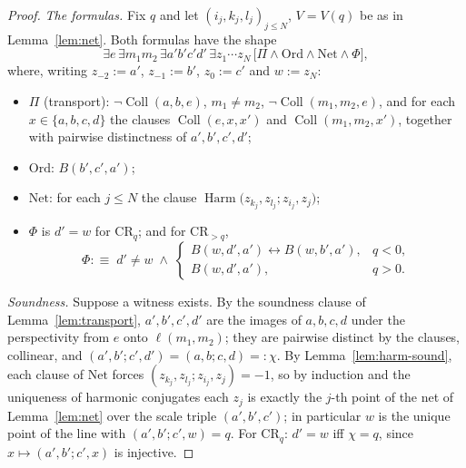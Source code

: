 \documentclass[11pt]{amsart}
\theoremstyle{definition}
\newcommand{\Coll}{\operatorname{Coll}}
\newcommand{\Harm}{\operatorname{Harm}}
\begin{document}
\begin{proof}
\emph{The formulas.} Fix $q$ and let $(i_j,k_j,l_j)_{j\le N}$, $V=V(q)$ be as
in Lemma~\ref{lem:net}. Both formulas have the shape
\[
\exists e\,\exists m_1 m_2\,\exists a'b'c'd'\,\exists z_1\cdots z_N\,
\bigl[\Pi\wedge\mathrm{Ord}\wedge\mathrm{Net}\wedge\Phi\bigr],
\]
where, writing $z_{-2}:=a'$, $z_{-1}:=b'$, $z_0:=c'$ and $w:=z_N$:
\begin{itemize}
\item $\Pi$ \textup(transport\textup): $\neg\Coll(a,b,e)$,
$m_1\ne m_2$, $\neg\Coll(m_1,m_2,e)$, and for each
$x\in\{a,b,c,d\}$ the clauses $\Coll(e,x,x')$ and $\Coll(m_1,m_2,x')$,
together with pairwise distinctness of $a',b',c',d'$;
\item $\mathrm{Ord}$: $B(b',c',a')$;
\item $\mathrm{Net}$: for each $j\le N$ the clause
$\Harm\bigl(z_{k_j},z_{l_j};z_{i_j},z_j\bigr)$;
\item $\Phi$ is $d'=w$ for $\mathrm{CR}_q$; and for $\mathrm{CR}_{>q}$,
\[
\Phi:\equiv\;d'\ne w\;\wedge\;
\begin{cases}
B(w,d',a')\leftrightarrow B(w,b',a'), & q<0,\\[1mm]
B(w,d',a'), & q>0 .
\end{cases}
\]
\end{itemize}

\emph{Soundness.} Suppose a witness exists. By the soundness clause of
Lemma~\ref{lem:transport}, $a',b',c',d'$ are the images of $a,b,c,d$ under
the perspectivity from $e$ onto $\ell(m_1,m_2)$; they are pairwise distinct
by the clauses, collinear, and
$(a',b';c',d')=(a,b;c,d)=:\chi$. By Lemma~\ref{lem:harm-sound}, each clause
of $\mathrm{Net}$ forces $(z_{k_j},z_{l_j};z_{i_j},z_j)=-1$, so by induction
and the uniqueness of harmonic conjugates each $z_j$ is exactly the $j$-th
point of the net of Lemma~\ref{lem:net} over the scale triple
$(a',b',c')$; in particular $w$ is the unique point of the line with
$(a',b';c',w)=q$. For $\mathrm{CR}_q$: $d'=w$ iff $\chi=q$, since
$x\mapsto(a',b';c',x)$ is injective.


\end{proof}
\end{document}

